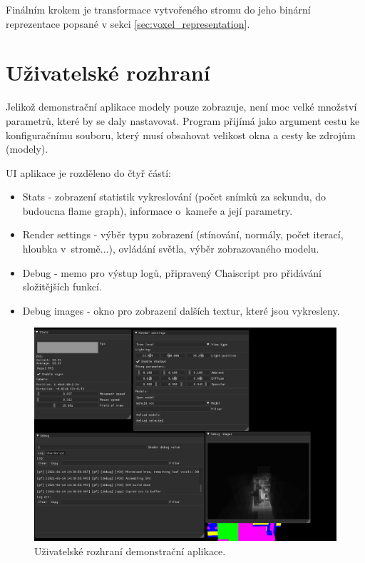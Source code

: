 Finálním krokem je transformace vytvořeného stromu do jeho binární reprezentace popsané v sekci \ref{sec:voxel_representation}.


\section{Uživatelské rozhraní}
Jelikož demonstrační aplikace modely pouze zobrazuje, není moc velké množství parametrů, které by se daly nastavovat. Program přijímá jako argument cestu ke konfiguračnímu souboru, který musí obsahovat velikost okna a cesty ke zdrojům (modely).

UI aplikace je rozděleno do čtyř částí:

\begin{itemize}
	\item Stats - zobrazení statistik vykreslování (počet snímků za sekundu, do budoucna flame graph), informace o~kameře a její parametry.
	\item Render settings - výběr typu zobrazení (stínování, normály, počet iterací, hloubka v~stromě...), ovládání světla, výběr zobrazovaného modelu.
	\item Debug - memo pro výstup logů, připravený Chaiscript pro přidávání složitějších funkcí.
	\item Debug images - okno pro zobrazení dalších textur, které jsou vykresleny.
\end{itemize}

\begin{figure}[H]
	\centering
	\includegraphics[scale=1]{obrazky-figures/svo_ui.png}
	\caption{Uživatelské rozhraní demonstrační aplikace.}
	\label{fig:svo_ui}
\end{figure}


